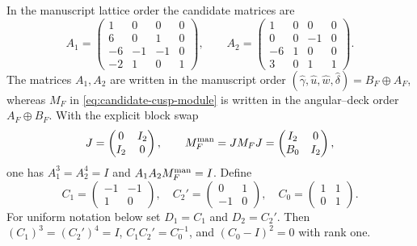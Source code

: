 \documentclass[11pt]{article}
\theoremstyle{definition}
\begin{document}
In the manuscript lattice order the candidate matrices are
\begin{equation}
 A_1=\begin{pmatrix}1&0&0&0\\6&0&1&0\\-6&-1&-1&0\\-2&1&0&1\end{pmatrix},
 \qquad
 A_2=\begin{pmatrix}1&0&0&0\\0&0&-1&0\\-6&1&0&0\\3&0&1&1\end{pmatrix}.
 \label{eq:finite-candidate-matrices}
\end{equation}
The matrices $A_1,A_2$ are written in the manuscript order
$(\widehat\gamma,\widehat u,\widehat w,\widehat\delta)=B_F\oplus A_F$,
whereas $M_F$ in \eqref{eq:candidate-cusp-module} is written in the
angular--deck order $A_F\oplus B_F$.  With the explicit block swap
\begin{equation}
 J=\begin{pmatrix}0&I_2\\ I_2&0\end{pmatrix},\qquad
 M_F^{\rm man}=JM_FJ=
 \begin{pmatrix}I_2&0\\ B_0&I_2\end{pmatrix},
 \label{eq:manuscript-cusp-order}
\end{equation}
one has
$A_1^3=A_2^4=I$ and $A_1A_2M_F^{\rm man}=I$.  Define
\begin{equation}
 C_1=\begin{pmatrix}-1&-1\\1&0\end{pmatrix},\quad
 C_2'=\begin{pmatrix}0&1\\-1&0\end{pmatrix},\quad
 C_0=\begin{pmatrix}1&1\\0&1\end{pmatrix}.
\label{eq:elliptic-peripheral-matrices}
\end{equation}
For uniform notation below set $D_1=C_1$ and $D_2=C_2'$.
Then $(C_1)^3=(C_2')^4=I$, $C_1C_2'=C_0^{-1}$, and
$(C_0-I)^2=0$ with rank one.
\end{document}
